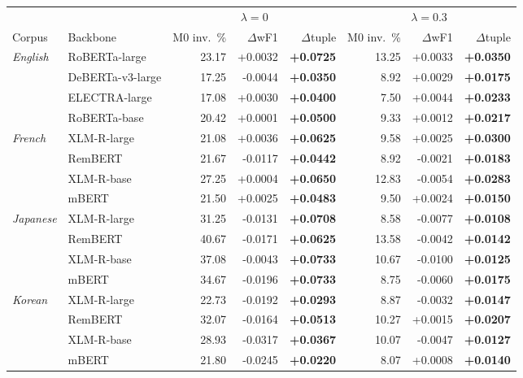 \begin{tabular}{llrrrrrr}
\toprule
 & & \multicolumn{3}{c}{$\lambda=0$} & \multicolumn{3}{c}{$\lambda=0.3$} \\
\cmidrule(lr){3-5}\cmidrule(lr){6-8}
Corpus & Backbone & M0 inv.\ \% & $\Delta$wF1 & $\Delta$tuple & M0 inv.\ \% & $\Delta$wF1 & $\Delta$tuple \\
\midrule
\emph{English} & RoBERTa-large & 23.17 & +0.0032 & \textbf{+0.0725} & 13.25 & +0.0033 & \textbf{+0.0350} \\
 & DeBERTa-v3-large & 17.25 & -0.0044 & \textbf{+0.0350} & 8.92 & +0.0029 & \textbf{+0.0175} \\
 & ELECTRA-large & 17.08 & +0.0030 & \textbf{+0.0400} & 7.50 & +0.0044 & \textbf{+0.0233} \\
 & RoBERTa-base & 20.42 & +0.0001 & \textbf{+0.0500} & 9.33 & +0.0012 & \textbf{+0.0217} \\
\midrule
\emph{French} & XLM-R-large & 21.08 & +0.0036 & \textbf{+0.0625} & 9.58 & +0.0025 & \textbf{+0.0300} \\
 & RemBERT & 21.67 & -0.0117 & \textbf{+0.0442} & 8.92 & -0.0021 & \textbf{+0.0183} \\
 & XLM-R-base & 27.25 & +0.0004 & \textbf{+0.0650} & 12.83 & -0.0054 & \textbf{+0.0283} \\
 & mBERT & 21.50 & +0.0025 & \textbf{+0.0483} & 9.50 & +0.0024 & \textbf{+0.0150} \\
\midrule
\emph{Japanese} & XLM-R-large & 31.25 & -0.0131 & \textbf{+0.0708} & 8.58 & -0.0077 & \textbf{+0.0108} \\
 & RemBERT & 40.67 & -0.0171 & \textbf{+0.0625} & 13.58 & -0.0042 & \textbf{+0.0142} \\
 & XLM-R-base & 37.08 & -0.0043 & \textbf{+0.0733} & 10.67 & -0.0100 & \textbf{+0.0125} \\
 & mBERT & 34.67 & -0.0196 & \textbf{+0.0733} & 8.75 & -0.0060 & \textbf{+0.0175} \\
\midrule
\emph{Korean} & XLM-R-large & 22.73 & -0.0192 & \textbf{+0.0293} & 8.87 & -0.0032 & \textbf{+0.0147} \\
 & RemBERT & 32.07 & -0.0164 & \textbf{+0.0513} & 10.27 & +0.0015 & \textbf{+0.0207} \\
 & XLM-R-base & 28.93 & -0.0317 & \textbf{+0.0367} & 10.07 & -0.0047 & \textbf{+0.0127} \\
 & mBERT & 21.80 & -0.0245 & \textbf{+0.0220} & 8.07 & +0.0008 & \textbf{+0.0140} \\
\bottomrule
\end{tabular}
